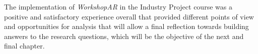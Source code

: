 The implementation of \emph{WorkshopAR} in the Industry Project course was a positive and satisfactory experience overall that provided different points of view and
opportunities for analysis that will allow a final reflection towards building answers to the research questions, which will be the objective of the next and final
chapter.